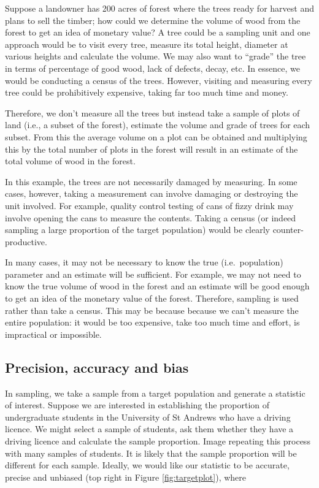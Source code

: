 \documentclass[
  oneside]{krantz}
\begin{document}
Suppose a landowner has 200 acres of forest where the trees ready for harvest and plans to sell the timber; how could we determine the volume of wood from the forest to get an idea of monetary value? A tree could be a sampling unit and one approach would be to visit every tree, measure its total height, diameter at various heights and calculate the volume. We may also want to ``grade'' the tree in terms of percentage of good wood, lack of defects, decay, etc. In essence, we would be conducting a census of the trees. However, visiting and measuring every tree could be prohibitively expensive, taking far too much time and money.

Therefore, we don't measure all the trees but instead take a sample of plots of land (i.e., a subset of the forest), estimate the volume and grade of trees for each subset. From this the average volume on a plot can be obtained and multiplying this by the total number of plots in the forest will result in an estimate of the total volume of wood in the forest.

In this example, the trees are not necessarily damaged by measuring. In some cases, however, taking a measurement can involve damaging or destroying the unit involved. For example, quality control testing of cans of fizzy drink may involve opening the cans to measure the contents. Taking a census (or indeed sampling a large proportion of the target population) would be clearly counter-productive.

In many cases, it may not be necessary to know the true (i.e.~population) parameter and an estimate will be sufficient. For example, we may not need to know the true volume of wood in the forest and an estimate will be good enough to get an idea of the monetary value of the forest. Therefore, sampling is used rather than take a census. This may be because because we can't measure the entire population: it would be too expensive, take too much time and effort, is impractical or impossible.

\hypertarget{precision-accuracy-and-bias}{%
\subsection{Precision, accuracy and bias}\label{precision-accuracy-and-bias}}

In sampling, we take a sample from a target population and generate a statistic of interest. Suppose we are interested in establishing the proportion of undergraduate students in the University of St Andrews who have a driving licence. We might select a sample of students, ask them whether they have a driving licence and calculate the sample proportion. Image repeating this process with many samples of students. It is likely that the sample proportion will be different for each sample. Ideally, we would like our statistic to be accurate, precise and unbiased (top right in Figure \ref{fig:targetplot}), where
\end{document}
